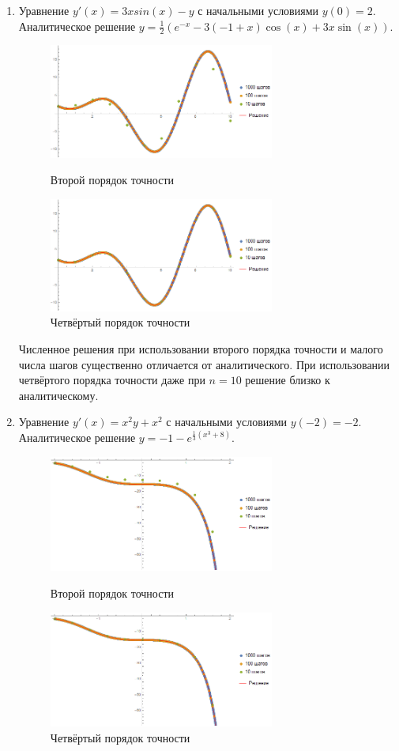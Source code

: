 \documentclass[a4paper,12pt,titlepage,finall]{article}
\begin{document}
\begin{enumerate}
\newpage
\item
Уравнение $y'(x) = 3x sin(x) - y$ с начальными условиями $y(0)=2$. Аналитическое решение $y = \frac{1}{2} (e^{-x} - 3 (-1 + x) \cos (x) + 3 x \sin (x))$.
\begin{figure}[h]
\centering
\includegraphics[width=0.7\textwidth]{test_1_2_2.png}
\caption{Второй порядок точности}
\centering
\includegraphics[width=0.7\textwidth]{test_1_2_4.png}
\caption{Четвёртый порядок точности}
\end{figure}
\par
Численное решения при использовании второго порядка точности и малого числа шагов существенно отличается от аналитического. При использовании четвёртого порядка точности даже при $n = 10$ решение близко к аналитическому.

\newpage
\item
Уравнение $y'(x) = x^2 y + x^2$ с начальными условиями $y(-2)=-2$. Аналитическое решение $y = -1 -e^{\frac{1}{3}(x^3 + 8)}$.
\begin{figure}[h]
\centering
\includegraphics[width=0.7\textwidth]{test_1_3_2.png}
\caption{Второй порядок точности}
\centering
\includegraphics[width=0.7\textwidth]{test_1_3_4.png}
\caption{Четвёртый порядок точности}
\end{figure}


\end{enumerate}
\end{document}
